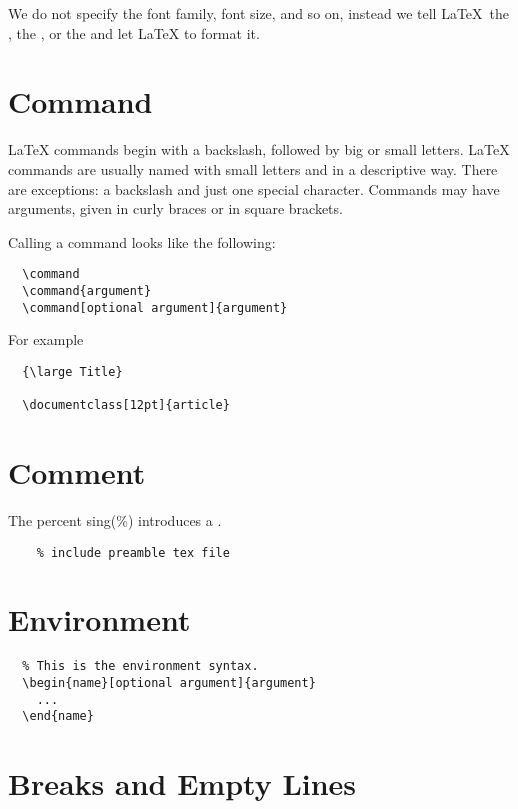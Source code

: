 We do not specify the font family, font size, and so on, instead we tell \LaTeX \ the , the , or the  and let \LaTeX{} to format it.



\section{Command}
LaTeX commands begin with a backslash, followed by big or small letters.
LaTeX commands are usually named with small letters and in a descriptive way.
There are exceptions: a backslash and just one special character.
Commands may have arguments, given in curly braces or in square brackets.

Calling a command looks like the following:


\begin{lstlisting}
  \command
  \command{argument}
  \command[optional argument]{argument}
\end{lstlisting}

For example

\begin{lstlisting}
  {\large Title}
  
  \documentclass[12pt]{article}
\end{lstlisting}

\section{Comment}
The percent sing(\%) introduces a .


\begin{lstlisting}
    % include preamble tex file
\end{lstlisting}

\section{Environment}
\label{sec:environment}
\begin{lstlisting}
  % This is the environment syntax.
  \begin{name}[optional argument]{argument}
    ...
  \end{name}
\end{lstlisting}


\section{Breaks and Empty Lines}
\label{sec:breaks-empty-lines}

